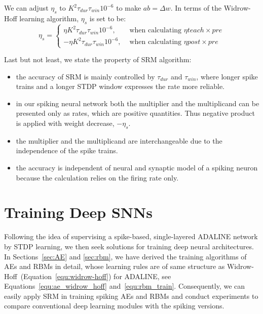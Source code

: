 We can adjust $\eta_s$ to $ K^2 \tau_{dur} \tau_{win}10^{-6}$ to make $ab = \Delta w$.
In terms of the Widrow-Hoff learning algorithm, $\eta_s$ is set to be:
\begin{equation}
	\eta_s=
    \left\{
    \begin{aligned} 
    \eta K^2 \tau_{dur} \tau_{win}10^{-6}, &\text{ when calculating } \eta teach \times pre\\
    - \eta K^2 \tau_{dur} \tau_{win}10^{-6}, &\text{ when calculating } \eta post \times pre
    \end{aligned}
    \right.
    \label{equ:eta_s}
\end{equation}

Last but not least, we state the property of SRM algorithm:
\begin{itemize}
	\item the accuracy of SRM is mainly controlled by $\tau_{dur}$ and $\tau_{win}$, where longer spike trains and a longer STDP window expresses the rate more reliable.
	\item in our spiking neural network both the multiplier and the multiplicand can be presented only as rates, which are positive quantities.
	Thus negative product is applied with weight decrease, $-\eta_s$. 
	\item the multiplier and the multiplicand are interchangeable due to the independence of the spike trains. 
	\item the accuracy is independent of neural and synaptic model of a spiking neuron because the calculation relies on the firing rate only.
\end{itemize}


\section{Training Deep SNNs}
\label{sec:dSNN}
Following the idea of supervising a spike-based, single-layered ADALINE network by STDP learning, we then seek solutions for training deep neural architectures.
In Sections~\ref{sec:AE} and \ref{sec:rbm}, we have derived the training algorithms of AEs and RBMs in detail, whose learning rules are of same structure as Widrow-Hoff~(Equation~\ref{equ:widrow-hoff}) for ADALINE, see Equations~\ref{equ:ae_widrow_hoff} and~\ref{equ:rbm_train}.
Consequently, we can easily apply SRM in training spiking AEs and RBMs and conduct experiments to compare conventional deep learning modules with the spiking versions.


